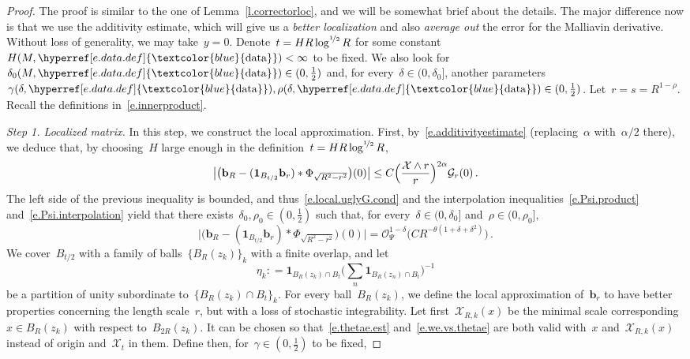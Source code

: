 \documentclass[11pt,twoside]{article} %
\numberwithin{equation}{section}
\theoremstyle{definition}
\newcommand{\dataref}{\hyperref[e.data.def]{\textcolor{blue}{\ensuremath{\mathrm{data}}}}}
\renewcommand{\b}{\ensuremath{\mathbf{b}}}
\newcommand{\X}{\mathcal{X}}
\renewcommand{\O}{\mathcal{O}}
\newcommand{\indc}{\boldsymbol{1}}
\begin{document}
\begin{proof}
The proof is similar to the one of Lemma~\ref{l.correctorloc}, and we will be somewhat brief about the details. The major difference now is that we use the additivity estimate, which will give us a \emph{better localization} and also \emph{average out} the error for the Malliavin derivative. Without loss of generality, we may take~$y = 0$. Denote~$t = H R \log^{\nicefrac 12} R$ for some constant~$H(M,\dataref)<\infty$ to be fixed. We also look for~$\delta_0(M,\dataref) \in (0,\frac12)$ and, for every~$\delta \in (0,\delta_0]$, another parameters~$\gamma(\delta,\dataref),\rho(\delta,\dataref) \in (0,\frac12)$. Let~$r = s = R^{1-\rho}$. Recall the definitions in~\eqref{e.innerproduct}. 

\smallskip

\emph{Step 1. Localized matrix.} In this step, we construct the local approximation. First, by~\eqref{e.additivityestimate} (replacing~$\alpha$ with~$\alpha/2$ there), we deduce that, by choosing~$H$ large enough in the definition~$t = H R \log^{\nicefrac 12} R$, 
\begin{align}
\label{e.additivityestimate.again.prepre}
\big|
\bigl( \b_{R} - (\indc_{B_{t/2}}   \b_{r} ) \ast \Phi_{\sqrt{R^2-r^2}} \bigr)(0)
\big|
\leq
C
\Bigl( \frac{\X \wedge r}{r} \Bigr)^{2\alpha} 
 \mathcal{G}_{r}(0) 
\,.
\end{align}
The left side of the previous inequality is bounded, and thus~\eqref{e.local.uglyG.cond} and the interpolation inequalities~\eqref{e.Psi.product} and~\eqref{e.Psi.interpolation} yield that there exists~$\delta_0,\rho_0 \in (0,\frac12)$ such that, for every~$\delta \in (0,\delta_0]$ and~$\rho \in (0,\rho_0]$, 
\begin{equation}
\label{e.additivityestimate.again.pre}
\big|
\bigl( \b_{R} - (\indc_{B_{t/2}}   \b_{r} ) \ast \Phi_{\sqrt{R^2-r^2}} \bigr)(0)
\big|
=
\O_\Psi^{1-\delta} \bigl( C R^{-\theta(1+\delta + \delta^2)} \bigr)  
\,.
\end{equation}
We cover~$B_{t/2}$ 
with a family of balls~$\{B_R(z_k)\}_k$ with a finite overlap, and let 
\begin{equation} \label{e.localization.eta}
\eta_k : = \indc_{B_R(z_k) \cap B_t} \biggl( \sum_n \indc_{B_R(z_n) \cap B_t}  \biggr)^{-1}
\end{equation}
be a partition of unity subordinate to~$\{B_R(z_k)  \cap B_t\}_k$. For every ball~$B_R(z_k)$, we define the local approximation of~$\b_r$ to have better properties concerning the length scale~$r$, but with a loss of stochastic integrability. Let first~$\X_{R,k}(x)$ be the minimal scale corresponding~$x\in B_R(z_k)$ with respect to~$B_{2R}(z_k)$. It can be chosen so that~\eqref{e.thetae.est} and~\eqref{e.we.vs.thetae} are both valid with~$x$ and~$\X_{R,k}(x)$ instead of origin and~$\X_t$ in them. Define then, for~$\gamma \in (0,\frac12)$ to be fixed, 

\end{proof}
\end{document}
